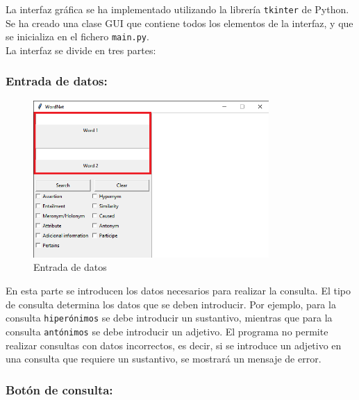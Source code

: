 \documentclass[12pt]{article}
\begin{document}
La interfaz gráfica se ha implementado utilizando la librería \texttt{tkinter} de Python. Se ha creado una clase GUI que contiene todos los elementos de la interfaz, y que se inicializa en el fichero \texttt{main.py}. \\
La interfaz se divide en tres partes:

\newpage

\subsubsection{Entrada de datos:}


\begin{figure}[h]
    \centering
    \includegraphics[width=0.8\textwidth]{entry.png}
    \caption{Entrada de datos}
    \label{fig:entry}
\end{figure}

En esta parte se introducen los datos necesarios para realizar la consulta. El tipo de consulta determina los datos que se deben introducir. Por ejemplo, para la consulta \texttt{hiperónimos} se debe introducir un sustantivo, mientras que para la consulta \texttt{antónimos} se debe introducir un adjetivo. El programa no permite realizar consultas con datos incorrectos, es decir, si se introduce un adjetivo en una consulta que requiere un sustantivo, se mostrará un mensaje de error.

\newpage

\subsubsection{Botón de consulta:}

\end{document}
